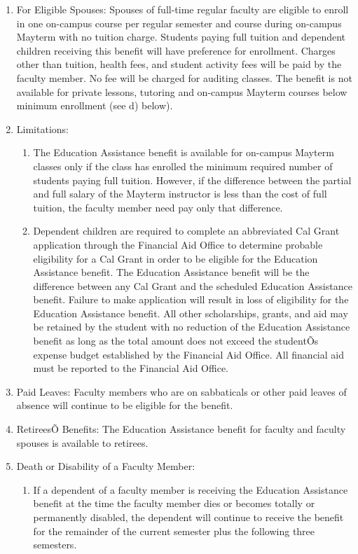 \documentclass[letterpaper, 11pt]{article}
\begin{document}
\begin{enumerate}[label=\alph*)]
					\item{For Eligible Spouses:}
					Spouses of full-time regular faculty are eligible to enroll in one on-campus course per regular semester and course during on-campus Mayterm with no tuition charge.  Students paying full tuition and dependent children receiving this benefit will have preference for enrollment.  Charges other than tuition, health fees, and student activity fees will be paid by the faculty member.  No fee will be charged for auditing classes.  The benefit is not available for private lessons, tutoring and on-campus Mayterm courses below minimum enrollment (see d) below).
					\item{Limitations:
						\begin{enumerate}[label=\arabic*)]
							\item{The Education Assistance benefit is available for on-campus Mayterm classes only if the class has enrolled the minimum required number of students paying full tuition.  However, if the difference between the partial and full salary of the Mayterm instructor is less than the cost of full tuition, the faculty member need pay only that difference.}
							\item{Dependent children are required to complete an abbreviated Cal Grant application through the Financial Aid Office to determine probable eligibility for a Cal Grant in order to be eligible for the Education Assistance benefit.  The Education Assistance benefit will be the difference between any Cal Grant and the scheduled Education Assistance benefit.  Failure to make application will result in loss of eligibility for the Education Assistance benefit.  All other scholarships, grants, and aid may be retained by the student with no reduction of the Education Assistance benefit as long as the total amount does not exceed the studentÕs expense budget established by the Financial Aid Office.  All financial aid must be reported to the Financial Aid Office.}
						\end{enumerate}
					}
					\item{Paid Leaves:}
					Faculty members who are on sabbaticals or other paid leaves of absence will continue to be eligible for the benefit.
					\item{RetireesÕ Benefits:}
					The Education Assistance benefit for faculty and faculty spouses is available to retirees.
					\item{Death or Disability of a Faculty Member:
						\begin{enumerate}[label=\arabic*)]
							\item{If a dependent of a faculty member is receiving the Education Assistance benefit at the time the faculty member dies or becomes totally or permanently disabled, the dependent will continue to receive the benefit for the remainder of the current semester plus the following three semesters.}

\end{enumerate}}
\end{enumerate}
\end{document}
